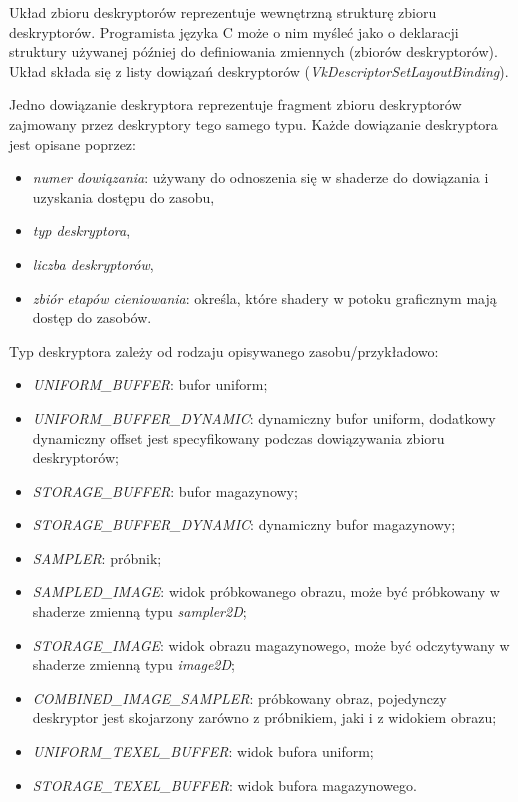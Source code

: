Układ zbioru deskryptorów reprezentuje wewnętrzną strukturę zbioru deskryptorów. Programista języka C może o nim myśleć jako o deklaracji struktury używanej później do definiowania zmiennych (zbiorów deskryptorów).
Układ składa się z listy dowiązań deskryptorów (\textit{VkDescriptorSetLayoutBinding}).

Jedno dowiązanie deskryptora reprezentuje fragment zbioru deskryptorów zajmowany przez deskryptory tego samego typu.
Każde dowiązanie deskryptora jest opisane poprzez:
\begin{itemize}
	\item {\textit{numer dowiązania}}: używany do odnoszenia się w shaderze do dowiązania i uzyskania dostępu do
	zasobu,
	\item \textit{typ deskryptora},
	\item \textit{liczba deskryptorów},
	\item {\textit{zbiór etapów cieniowania}}: określa, które shadery w potoku graficznym mają dostęp do zasobów.
\end{itemize}
Typ deskryptora zależy od rodzaju opisywanego zasobu/przykładowo:
\begin{itemize}
	\item {\textit{UNIFORM\_BUFFER}}: bufor uniform;
	\item {\textit{UNIFORM\_BUFFER\_DYNAMIC}}: dynamiczny bufor uniform, dodatkowy dynamiczny offset jest specyfikowany podczas dowiązywania zbioru deskryptorów;
	\item {\textit{STORAGE\_BUFFER}}: bufor magazynowy;
	\item {\textit{STORAGE\_BUFFER\_DYNAMIC}}: dynamiczny bufor magazynowy;
	\item {\textit{SAMPLER}}: próbnik;
	\item {\textit{SAMPLED\_IMAGE}}: widok próbkowanego obrazu, może być próbkowany w shaderze zmienną typu \textit{sampler2D};
	\item {\textit{STORAGE\_IMAGE}}: widok obrazu magazynowego, może być odczytywany w shaderze zmienną typu \textit{image2D};
	\item {\textit{COMBINED\_IMAGE\_SAMPLER}}: próbkowany obraz, pojedynczy deskryptor jest skojarzony zarówno z próbnikiem, jaki i z widokiem obrazu;
	\item {\textit{UNIFORM\_TEXEL\_BUFFER}}: widok bufora uniform;
	\item {\textit{STORAGE\_TEXEL\_BUFFER}}: widok bufora magazynowego.
\end{itemize}

